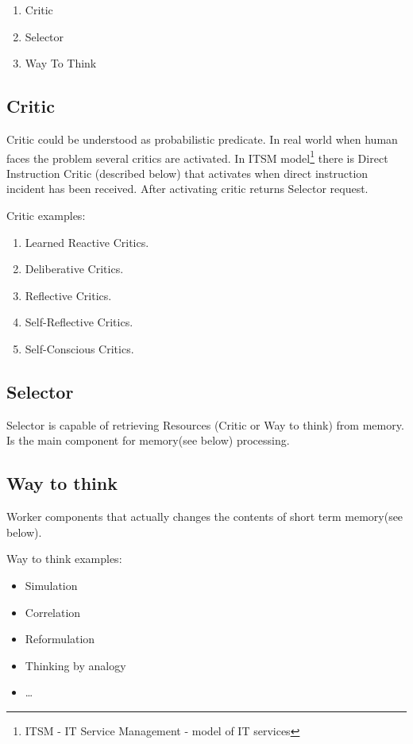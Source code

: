 \documentclass[runningheads,a4paper]{llncs}
\begin{document}
\begin{enumerate}
 \item Critic
 \item Selector
 \item Way To Think
\end{enumerate}

\subsection{Critic}
Critic could be understood as probabilistic predicate. In real world when human faces the problem several critics are activated. In ITSM model\footnote{ITSM - IT Service Management - model of IT services} there is Direct Instruction Critic (described below) that activates when direct instruction incident has been received. After activating critic returns Selector request.

Critic examples:

\begin{enumerate}
 \item Learned Reactive Critics.
 \item Deliberative Critics.
 \item Reflective Critics.
 \item Self-Reflective Critics.
 \item Self-Conscious Critics.
\end{enumerate}

\subsection{Selector}
Selector is capable of retrieving Resources (Critic or Way to think) from memory. Is the main component for memory(see below) processing.

\subsection{Way to think}

Worker components that actually changes the contents of short term memory(see below).

Way to think examples:
\begin{itemize}
 \item Simulation
 \item Correlation
 \item Reformulation
 \item Thinking by analogy
 \item …
\end{itemize}
\end{document}
